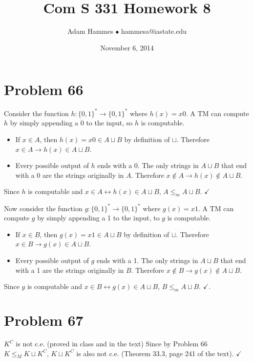 \documentclass[11pt]{article}
\let\iff\leftrightarrow
\let\imp\rightarrow
\begin{document}
\title{Com S 331 Homework 8}
\author{Adam Hammes $\bullet$ hammesa@iastate.edu}
\date{November 6, 2014}
\maketitle

\section*{Problem 66}

Consider the function $h: \{0,1\}^* \imp \{0,1\}^*$ where $h(x) = x0$.
A TM can compute $h$ by simply appending a 0 to the input, so $h$ is computable.
\begin{itemize}
	\item If $x \in A$, then $h(x) = x0 \in A \sqcup B$ by definition of $\sqcup$. 
	Therefore $x \in A \imp h(x) \in A \sqcup B$.
	\item Every possible output of $h$ ends with a 0.
	The only strings in $A \sqcup B$ that end with a 0 are the strings originally in $A$.
	Therefore $ x \notin A \imp h(x) \notin A \sqcup B$.
\end{itemize}

Since $h$ is computable and $x \in A \iff h(x) \in A \sqcup B$, $A \leq _m A \sqcup B$. $\checkmark$

Now consider the function $g: \{0,1\}^* \imp \{0,1\}^*$ where $g(x) = x1$.
A TM can compute $g$ by simply appending a 1 to the input, to $g$ is computable.
\begin{itemize}
	\item If $x \in B$, then $g(x) = x1 \in A \sqcup B$ by definition of $\sqcup$. 
	Therefore $x \in B \imp g(x) \in A \sqcup B$.
	\item Every possible output of $g$ ends with a 1.
	The only strings in $A \sqcup B$ that end with a 1 are the strings originally in $B$.
	Therefore $ x \notin B \imp g(x) \notin A \sqcup B$.
\end{itemize}

Since $g$ is computable and $x \in B \iff g(x) \in A \sqcup B$, $B \leq _m A \sqcup B$. $\checkmark$.


\section*{Problem 67}

$K^C$ is not c.e. (proved in class and in the text)
Since by Problem 66 $K \leq _M K \sqcup K^C$, $K \sqcup K^C$ is also not c.e. (Theorem 33.3, page 241 of the text). $\checkmark$
\end{document}
